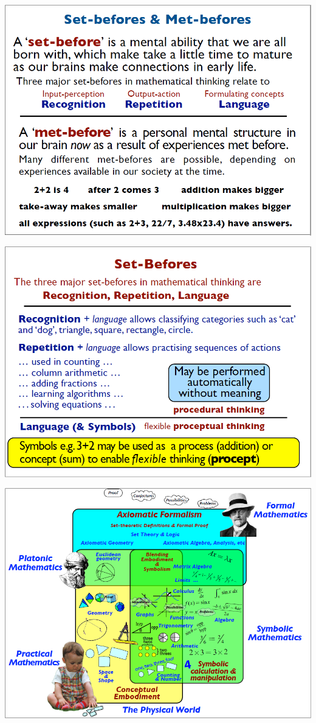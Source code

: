\documentclass{article}
\begin{document}
\hspace{\fill}%
\begin{minipage}[t]{0.32\linewidth}%
	\includegraphics[width=1\textwidth]{david_tall/dt3.png}%
	
	\includegraphics[width=1\textwidth]{david_tall/dt6.png}%
	
	\includegraphics[width=1\textwidth]{david_tall/dt9.png}%
	

\end{minipage}
\end{document}
